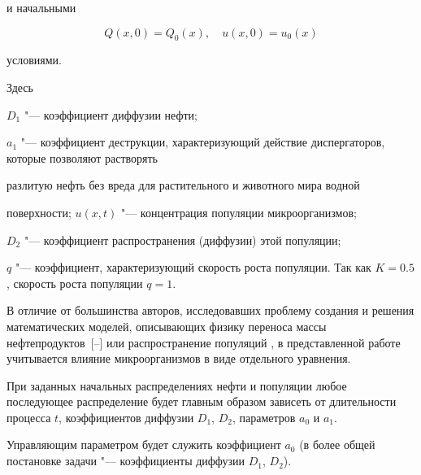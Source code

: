 и начальными

\[

Q(x, 0)=Q_0 (x), \quad u(x, 0)=u_0 (x)

\]

условиями.

Здесь 

$D_1$ "--- коэффициент диффузии нефти;

$a_1$ "--- коэффициент деструкции, характеризующий действие диспергаторов, которые позволяют растворять

разлитую нефть без вреда для растительного и животного мира водной

поверхности; $u(x, t)$ "--- концентрация популяции микроорганизмов; 

$D_2$ "--- коэффициент распространения (диффузии) этой популяции; 

$q$ "--- коэффициент, характеризующий скорость роста популяции. Так  как $K=0.5$, скорость роста популяции $q=1$.










В отличие от большинства авторов, исследовавших проблему создания и решения математических моделей, описывающих физику переноса массы нефтепродуктов~[--] или распространение популяций \cite{afa:bib9,afa:bib10}, в представленной работе учитывается влияние микроорганизмов в виде отдельного уравнения. 

При заданных начальных распределениях нефти и популяции любое последующее распределение будет главным образом зависеть от длительности процесса $t$, коэффициентов диффузии $D_1$, $D_2$, параметров $a_0$ и $a_1$. 

Управляющим параметром будет служить коэффициент $a_0$ (в более общей постановке задачи "--- коэффициенты диффузии $D_1$, $D_2$).

